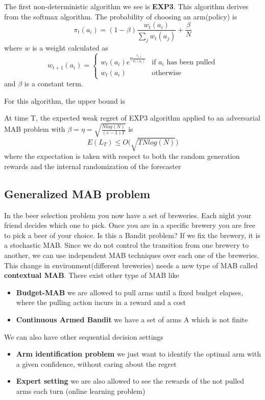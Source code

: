 \documentclass[main.tex]{subfiles}
\begin{document}
The first non-deterministic algorithm we see is \textbf{EXP3}.
This algorithm derives from the softmax algorithm.
The probability of choosing an arm(policy) is
\begin{equation}
    \pi_t(a_i) = (1-\beta) \frac{w_t(a_i)}{\sum_j w_t(a_j)} + \frac{\beta}{N}
\end{equation}
where $w$ is a weight calculated as
\begin{equation*}
    w_{t+1}(a_i) =
    \begin{cases}
    w_t(a_i)e^{\eta \frac{r_{i,t}}{\pi_t(a_i)}} & \text{if $a_i$ has been pulled} \\
    w_t(a_i) & \text{otherwise}
    \end{cases}
\end{equation*}
and $\beta$ is a constant term.
\par \noindent
For this algorithm, the upper bound is
\begin{theorem}
At time T, the expected weak regret of EXP3 algorithm applied to an adversarial MAB problem with $\beta = \eta = \sqrt{\frac{Nlog(N)}{(e-1)T}}$ is
\begin{equation*}
    E(L_T) \leq O\big( \sqrt{TNlog(N)} \big)
\end{equation*}
where the expectation is taken with respect to both the random generation rewards and the internal randomization of the forecaster
\end{theorem}

\subsection{Generalized MAB problem}
In the beer selection problem you now have a set of breweries. Each night your friend decides which one to pick. Once you are in a specific brewery you are free to pick a beer of your choice.
Is this a Bandit problem?
If we fix the brewery, it is a stochastic MAB. Since we do not control the transition from one brewery to another, we can use independent MAB techniques over each one of the breweries. This change in environment(different breweries) needs a new type of MAB called \textbf{contextual MAB}. There exist other type of MAB like
\begin{itemize}
    \item \textbf{Budget-MAB} we are allowed to pull arms until a fixed budget elapses, where the pulling action incurs in a reward and a cost
    \item \textbf{Continuous Armed Bandit} we have a set of arms A which is not finite
\end{itemize}
We can also have other sequential decision settings
\begin{itemize}
    \item \textbf{Arm identification problem} we just want to identify the optimal arm with a given confidence, without caring about the regret
    \item \textbf{Expert setting} we are also allowed to see the rewards of the not pulled arms each turn (online learning problem)
\end{itemize}
\end{document}
